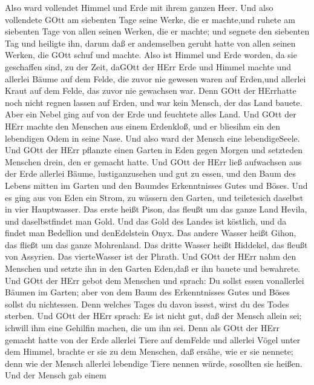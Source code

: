  Also ward vollendet Himmel und Erde mit ihrem ganzen Heer.
 Und also vollendete GOtt am siebenten Tage seine Werke, die
er machte,und ruhete am siebenten Tage von allen seinen Werken, die er
machte;  und segnete den siebenten Tag und heiligte ihn,
darum daß er andemselben geruht hatte von allen seinen Werken, die GOtt
schuf und machte.  Also ist Himmel und Erde worden, da sie
geschaffen sind, zu der Zeit, daGOtt der HErr Erde und Himmel machte
 und allerlei Bäume auf dem Felde, die zuvor nie gewesen
waren auf Erden,und allerlei Kraut auf dem Felde, das zuvor nie
gewachsen war. Denn GOtt der HErrhatte noch nicht regnen lassen auf
Erden, und war kein Mensch, der das Land bauete.  Aber ein
Nebel ging auf von der Erde und feuchtete alles Land.  Und
GOtt der HErr machte den Menschen aus einem Erdenkloß, und er bliesihm
ein den lebendigen Odem in seine Nase. Und also ward der Mensch eine
lebendigeSeele.  Und GOtt der HErr pflanzte einen Garten in
Eden gegen Morgen und setzteden Menschen drein, den er gemacht hatte.
 Und GOtt der HErr ließ aufwachsen aus der Erde allerlei
Bäume, lustiganzusehen und gut zu essen, und den Baum des Lebens mitten
im Garten und den Baumdes Erkenntnisses Gutes und Böses. 
Und es ging aus von Eden ein Strom, zu wässern den Garten, und
teiletesich daselbst in vier Hauptwasser.  Das erste heißt
Pison, das fleußt um das ganze Land Hevila, und daselbstfindet man Gold.
 Und das Gold des Landes ist köstlich, und da findet man
Bedellion und denEdelstein Onyx.  Das andere Wasser heißt
Gihon, das fließt um das ganze Mohrenland.  Das dritte
Wasser heißt Hiddekel, das fleußt von Assyrien. Das vierteWasser ist der
Phrath.  Und GOtt der HErr nahm den Menschen und setzte ihn
in den Garten Eden,daß er ihn bauete und bewahrete.  Und
GOtt der HErr gebot dem Menschen und sprach: Du sollst essen vonallerlei
Bäumen im Garten;  aber von dem Baum des Erkenntnisses
Gutes und Böses sollst du nichtessen. Denn welches Tages du davon
issest, wirst du des Todes sterben.  Und GOtt der HErr
sprach: Es ist nicht gut, daß der Mensch allein sei; ichwill ihm eine
Gehilfin machen, die um ihn sei.  Denn als GOtt der HErr
gemacht hatte von der Erde allerlei Tiere auf demFelde und allerlei
Vögel unter dem Himmel, brachte er sie zu dem Menschen, daß ersähe, wie
er sie nennete; denn wie der Mensch allerlei lebendige Tiere nennen
würde, sosollten sie heißen.  Und der Mensch gab einem
